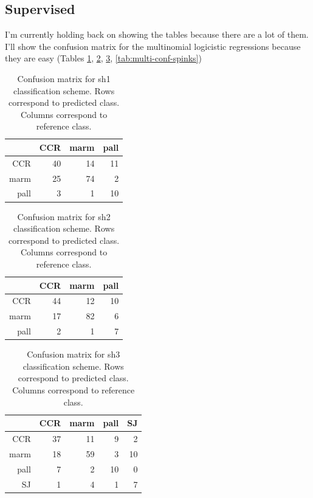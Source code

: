 \documentclass{article}\usepackage{graphicx, color}
\begin{document}
\subsection{Supervised}

I'm currently holding back on showing the tables because there are a lot of them. I'll show the confusion matrix for the multinomial logicistic regressions because they are easy (Tables \ref{tab:multi-conf-sh1}, \ref{tab:multi-conf-sh2}, \ref{tab:multi-conf-sh3}, \ref{tab:multi-conf-spinks})

\begin{table}[ht]
\begin{center}
\begin{tabular}{rrrr}
  \hline
 & CCR & marm & pall \\ 
  \hline
CCR &  40 &  14 &  11 \\ 
  marm &  25 &  74 &   2 \\ 
  pall &   3 &   1 &  10 \\ 
   \hline
\end{tabular}
\caption{Confusion matrix for sh1 classification scheme. Rows correspond to predicted class. Columns correspond to reference class.}
\label{tab:multi-conf-sh1}
\end{center}
\end{table}
\begin{table}[ht]
\begin{center}
\begin{tabular}{rrrr}
  \hline
 & CCR & marm & pall \\ 
  \hline
CCR &  44 &  12 &  10 \\ 
  marm &  17 &  82 &   6 \\ 
  pall &   2 &   1 &   7 \\ 
   \hline
\end{tabular}
\caption{Confusion matrix for sh2 classification scheme. Rows correspond to predicted class. Columns correspond to reference class.}
\label{tab:multi-conf-sh2}
\end{center}
\end{table}
\begin{table}[ht]
\begin{center}
\begin{tabular}{rrrrr}
  \hline
 & CCR & marm & pall & SJ \\ 
  \hline
CCR &  37 &  11 &   9 &   2 \\ 
  marm &  18 &  59 &   3 &  10 \\ 
  pall &   7 &   2 &  10 &   0 \\ 
  SJ &   1 &   4 &   1 &   7 \\ 
   \hline
\end{tabular}
\caption{Confusion matrix for sh3 classification scheme. Rows correspond to predicted class. Columns correspond to reference class.}
\label{tab:multi-conf-sh3}
\end{center}
\end{table}
\end{document}
